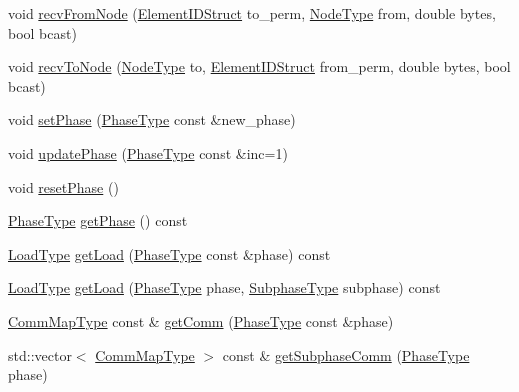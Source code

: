 \begin{DoxyCompactItemize}
\item 
void \hyperlink{structvt_1_1elm_1_1_element_l_b_data_aadd1fa3ab5c86886b970989d05286901}{recv\+From\+Node} (\hyperlink{structvt_1_1elm_1_1_element_i_d_struct}{Element\+I\+D\+Struct} to\+\_\+perm, \hyperlink{namespacevt_a866da9d0efc19c0a1ce79e9e492f47e2}{Node\+Type} from, double bytes, bool bcast)
\item 
void \hyperlink{structvt_1_1elm_1_1_element_l_b_data_ac9fefbad98060214e8720b46a5a8aaf6}{recv\+To\+Node} (\hyperlink{namespacevt_a866da9d0efc19c0a1ce79e9e492f47e2}{Node\+Type} to, \hyperlink{structvt_1_1elm_1_1_element_i_d_struct}{Element\+I\+D\+Struct} from\+\_\+perm, double bytes, bool bcast)
\item 
void \hyperlink{structvt_1_1elm_1_1_element_l_b_data_afd6173ea281a044490a08976cb859dfc}{set\+Phase} (\hyperlink{namespacevt_a46ce6733d5cdbd735d561b7b4029f6d7}{Phase\+Type} const \&new\+\_\+phase)
\item 
void \hyperlink{structvt_1_1elm_1_1_element_l_b_data_acb64ab9bcd98f12bd5cae08ebbefd943}{update\+Phase} (\hyperlink{namespacevt_a46ce6733d5cdbd735d561b7b4029f6d7}{Phase\+Type} const \&inc=1)
\item 
void \hyperlink{structvt_1_1elm_1_1_element_l_b_data_aa6547718a29385a1600e29ae4b0792dd}{reset\+Phase} ()
\item 
\hyperlink{namespacevt_a46ce6733d5cdbd735d561b7b4029f6d7}{Phase\+Type} \hyperlink{structvt_1_1elm_1_1_element_l_b_data_ab3e11f3720c9c8ce83b23610eccbef08}{get\+Phase} () const
\item 
\hyperlink{namespacevt_a8fb51741340b87d7aaee0bef60e9896b}{Load\+Type} \hyperlink{structvt_1_1elm_1_1_element_l_b_data_a839f0515eda6316ee2d6e64bb145e1f4}{get\+Load} (\hyperlink{namespacevt_a46ce6733d5cdbd735d561b7b4029f6d7}{Phase\+Type} const \&phase) const
\item 
\hyperlink{namespacevt_a8fb51741340b87d7aaee0bef60e9896b}{Load\+Type} \hyperlink{structvt_1_1elm_1_1_element_l_b_data_abbc3c3c8a7c969b0a291f25b8e0d0a62}{get\+Load} (\hyperlink{namespacevt_a46ce6733d5cdbd735d561b7b4029f6d7}{Phase\+Type} phase, \hyperlink{namespacevt_ae78cbfdf1e57470e33eedb074f2beeba}{Subphase\+Type} subphase) const
\item 
\hyperlink{namespacevt_1_1elm_a38487cb8896b9b4763efa9022fab560e}{Comm\+Map\+Type} const  \& \hyperlink{structvt_1_1elm_1_1_element_l_b_data_a9a59e8546283b731702d07f2360d527d}{get\+Comm} (\hyperlink{namespacevt_a46ce6733d5cdbd735d561b7b4029f6d7}{Phase\+Type} const \&phase)
\item 
std\+::vector$<$ \hyperlink{namespacevt_1_1elm_a38487cb8896b9b4763efa9022fab560e}{Comm\+Map\+Type} $>$ const  \& \hyperlink{structvt_1_1elm_1_1_element_l_b_data_a32d430c814238614d01cc4bc87c3b22b}{get\+Subphase\+Comm} (\hyperlink{namespacevt_a46ce6733d5cdbd735d561b7b4029f6d7}{Phase\+Type} phase)

\end{DoxyCompactItemize}
